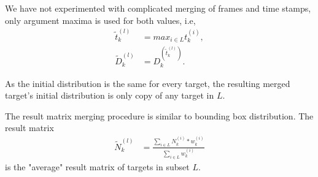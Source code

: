 We have not experimented with complicated merging of frames and time stamps, only argument maxima is used for both
values, i.e,
\begin{align}
  \tilde{t}_k^{(l)} &= max_{i \in L} t_k^{(i)}, \\
  \tilde{D}_k^{(l)} &= D_k^{(\tilde{t}_k^{(l)})}.
\end{align}

As the initial distribution is the same for every target, the resulting merged target's initial distribution is only
copy of any target in $L$.

The result matrix merging procedure is similar to bounding box distribution. The result matrix
\begin{align}
  \tilde{N}_k^{(l)} &= \frac{\sum_{i \in L} N_k^{(i)} * w_k^{(i)}}{\sum_{i \in L}{w_k^{(i)}}}
\end{align}
is the "average" result matrix of targets in subset $L$.

